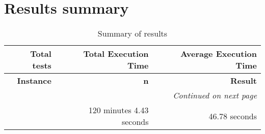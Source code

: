 \section{Results summary}
 \begin{longtable}{rrr} \caption{Summary of results}\label{table:results_summary}\\ \toprule \textbf{Total tests}& \textbf{Total Execution Time}& \textbf{Average Execution Time}\\
\midrule
\endfirsthead
\toprule
\textbf{Instance} & \textbf{n} & \textbf{Result} \\
\midrule
\endhead
\midrule
\multicolumn{3}{r}{\textit{Continued on next page}} \\
\midrule
\endfoot
\bottomrule
\endlastfoot
154 & 120 minutes 4.43 seconds & 46.78 seconds \\
\end{longtable}

